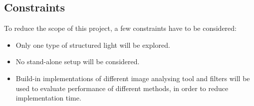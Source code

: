 \subsection{Constraints}
To reduce the scope of this project, a few constraints have to be considered:
\begin{itemize}
    \item Only one type of structured light will be explored.
    \item No stand-alone setup will be considered.
    \item Build-in implementations of different image analysing tool and filters will be used to evaluate performance of different methods, in order to reduce implementation time. 
\end{itemize}









